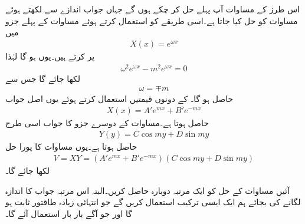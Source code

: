 اس طرز کے مساوات آپ پہلے حل کر چکے ہوں گے جہاں جواب اندازے سے لکھتے ہوئے مساوات کو حل کیا جاتا ہے۔اسی طریقے کو استعمال کرتے ہوئے مساوات  کے پہلے جزو میں
\begin{align*}
X(x)=e^{\omega x}
\end{align*}
پر کرتے ہیں۔یوں  ہو گا لہٰذا
\begin{align*}
\omega^2 e^{\omega x}-m^2 e^{\omega x}=0
\end{align*}
لکھا جائے گا جس سے 
\begin{align*}
\omega = \mp m
\end{align*}
حاصل ہو گا۔ کے دونوں قیمتیں استعمال کرتے ہوئے یوں اصل جواب
\begin{align}\label{مساوات_لاپلاس_اندازہ_الف}
X(x)=A' e^{mx}+B' e^{-m x}
\end{align} 
حاصل ہوتا ہے۔مساوات  کے دوسرے جزو کا جواب اسی طرح
\begin{align}\label{مساوات_لاپلاس_اندازہ_ب}
Y(y)=C \cos m y+D \sin m y
\end{align}
حاصل ہوتا ہے۔یوں مساوات  کا پورا حل
\begin{align}\label{مساوات_لاپلاس_اندازہ_پ}
V=XY=\left(A' e^{mx}+B' e^{-m x} \right) \left(C \cos m y+D \sin m y \right)
\end{align}
لکھا جائے گا۔

آئیں مساوات  کے حل کو ایک مرتبہ دوبارہ حاصل کریں۔البتہ اس مرتبہ جواب کا اندازہ لگانے کی بجائے ہم ایک ایسی ترکیب استعمال کریں گے جو انتہائی زیادہ طاقتور ثابت ہو گا اور جو آگے بار بار استعمال آئے گا۔

